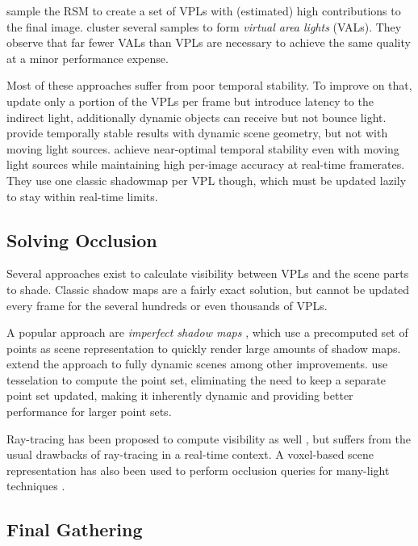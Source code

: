 \citet{georgiev2010simple, ritschel2011ismsViewAdaptive} sample the RSM to create a set of VPLs with (estimated) high contributions to the final image. \citet{dong2009real, prutkin2012reflective} cluster several samples to form \emph{virtual area lights} (VALs). They observe that far fewer VALs than VPLs are necessary to achieve the same quality at a minor performance expense.

Most of these approaches suffer from poor temporal stability. To improve on that, \citet{laine2007incremental} update only a portion of the VPLs per frame but introduce latency to the indirect light, additionally dynamic objects can receive but not bounce light. \citet{barak2013temporally} provide temporally stable results with dynamic scene geometry, but not with moving light sources. \citet{hedman2016sequential} achieve near-optimal temporal stability even with moving light sources while maintaining high per-image accuracy at real-time framerates. They use one classic shadowmap per VPL though, which must be updated lazily to stay within real-time limits.


\subsection{Solving Occlusion}

Several approaches exist to calculate visibility between VPLs and the scene parts to shade. Classic shadow maps are a fairly exact solution, but cannot be updated every frame for the several hundreds or even thousands of VPLs.

A popular approach are \emph{imperfect shadow maps} \citep[ISMs,][]{ritschel2008ism}, which use a precomputed set of points as scene representation to quickly render large amounts of shadow maps. \citet{ritschel2011ismsViewAdaptive} extend the approach to fully dynamic scenes among other improvements. \citet{barak2013temporally} use tesselation to compute the point set, eliminating the need to keep a separate point set updated, making it inherently dynamic and providing better performance for larger point sets.

Ray-tracing has been proposed to compute visibility as well \citep[e.\,g.][]{segovia2006bidirectional}, but suffers from the usual drawbacks of ray-tracing in a real-time context. A voxel-based scene representation has also been used to perform occlusion queries for many-light techniques \citep{sun2015manylightsSVO}.


\subsection{Final Gathering}

